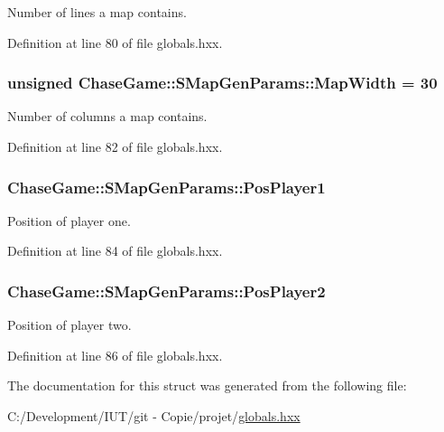 Number of lines a map contains. 



Definition at line 80 of file globals.\-hxx.

\hypertarget{struct_chase_game_1_1_s_map_gen_params_a0897aeaa1a1a3a66697a6b441ca8c2de}{
\subsubsection[{Map\-Width}]{\setlength{\rightskip}{0pt plus 5cm}unsigned Chase\-Game\-::\-S\-Map\-Gen\-Params\-::\-Map\-Width = 30}}\label{struct_chase_game_1_1_s_map_gen_params_a0897aeaa1a1a3a66697a6b441ca8c2de}


Number of columns a map contains. 



Definition at line 82 of file globals.\-hxx.

\hypertarget{struct_chase_game_1_1_s_map_gen_params_a8db28a9ee45a200d67b20fc803645501}{
\subsubsection[{Pos\-Player1}]{ Chase\-Game\-::\-S\-Map\-Gen\-Params\-::\-Pos\-Player1}}\label{struct_chase_game_1_1_s_map_gen_params_a8db28a9ee45a200d67b20fc803645501}


Position of player one. 



Definition at line 84 of file globals.\-hxx.

\hypertarget{struct_chase_game_1_1_s_map_gen_params_afd0a0d4b22e228d547af88d38b6ae963}{
\subsubsection[{Pos\-Player2}]{ Chase\-Game\-::\-S\-Map\-Gen\-Params\-::\-Pos\-Player2}}\label{struct_chase_game_1_1_s_map_gen_params_afd0a0d4b22e228d547af88d38b6ae963}


Position of player two. 



Definition at line 86 of file globals.\-hxx.



The documentation for this struct was generated from the following file\-:\begin{DoxyCompactItemize}
\item 
C\-:/\-Development/\-I\-U\-T/git -\/ Copie/projet/\hyperlink{globals_8hxx}{globals.\-hxx}\end{DoxyCompactItemize}
